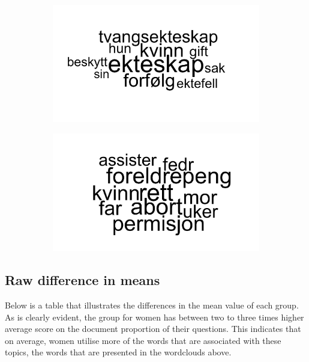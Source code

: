 \documentclass[12pt]{article}
\begin{document}
	\begin{figure}[h]
		\centering
		\begin{subfigure}{0.45\linewidth}
			\includegraphics[scale=0.40]{topic158wordcloud.png}
		\end{subfigure}
		\begin{subfigure}{0.45\linewidth}
			\includegraphics[scale=0.40]{topic164wordcloud.png}
		\end{subfigure}
	\end{figure}
	
	\subsection{Raw difference in means}
	
	Below is a table that illustrates the differences in the mean value of each group. As is clearly evident, the group for women has between two to three times higher average score on the document proportion of their questions. This indicates that on average, women utilise more of the words that are associated with these topics, the words that are presented in the wordclouds above. 
	
\end{document}
